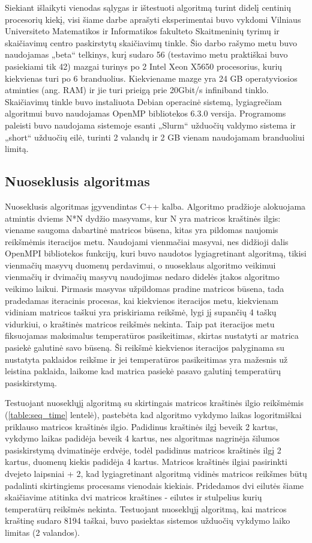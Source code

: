 \documentclass{VUMIFPSbakalaurinis}
\begin{document}
Siekiant išlaikyti vienodas sąlygas ir ištestuoti algoritmą turint didelį centinių procesorių kiekį, visi šiame darbe aprašyti eksperimentai buvo vykdomi Vilniaus Universiteto Matematikos ir Informatikos fakulteto Skaitmeninių tyrimų ir skaičiavimų centro paskirstytų skaičiavimų tinkle.
Šio darbo rašymo metu buvo naudojamas „beta“ telkinys, kurį sudaro 56 (testavimo metu praktiškai buvo pasiekiami tik 42) mazgai turinys po 2 Intel Xeon X5650 procesorius, kurių kiekvienas turi po 6 branduolius. 
Kiekviename mazge yra 24 GB operatyviosios atminties (ang. RAM) ir jie turi prieigą prie 20Gbit/s infiniband tinklo.
Skaičiavimų tinkle buvo instaliuota Debian operacinė sistemą, lygiagrečiam algoritmui buvo naudojamas OpenMP bibliotekos 6.3.0 versija.
Programoms paleisti buvo naudojama sistemoje esanti „Slurm“ užduočių valdymo sistema ir „short“ užduočių eilė, turinti 2 valandų ir 2 GB vienam naudojamam branduoliui limitą.

\subsection{Nuoseklusis algoritmas}

Nuoseklusis algoritmas įgyvendintas C++ kalba. 
Algoritmo pradžioje alokuojama atmintis dviems N*N dydžio masyvams, kur N yra matricos kraštinės ilgis: viename saugoma dabartinė matricos būsena, kitas yra pildomas naujomis reikšmėmis iteracijos metu.
Naudojami vienmačiai masyvai, nes didžioji dalis OpenMPI bibliotekos funkcijų, kuri buvo naudotos lygiagretinant algoritmą, tikisi vienmačių masyvų duomenų perdavimui, o nuoseklaus algoritmo veikimui vienmačių ir dvimačių masyvų naudojimas nedaro didelės įtakos algoritmo veikimo laikui.
Pirmasis masyvas užpildomas pradine matricos būsena, tada pradedamas iteracinis procesas, kai kiekvienos iteracijos metu, kiekvienam vidiniam matricos taškui yra priskiriama reikšmė, lygi jį supančių 4 taškų vidurkiui, o kraštinės matricos reikšmės nekinta.
Taip pat iteracijos metu fiksuojamas maksimalus temperatūros pasikeitimas, skirtas nustatyti ar matrica pasiekė galutinė savo būseną.
Ši reikšmė kiekvienos iteracijos palyginama su nustatyta paklaidos reikšme ir jei temperatūros pasikeitimas yra mažesnis už leistina paklaida, laikome kad matrica pasiekė pasavo galutinį temperatūrų pasiskirstymą.

Testuojant nuoseklųjį algoritmą su skirtingais matricos kraštinės ilgio reikšmėmis (\ref{table:seq_time} lentelė), pastebėta kad algoritmo vykdymo laikas logoritmiškai priklauso matricos kraštinės ilgio.
Padidinus kraštinės ilgį beveik 2 kartus, vykdymo laikas padidėja beveik 4 kartus, nes algoritmas nagrinėja šilumos pasiskirstymą dvimatinėje erdvėje, todėl padidinus matricos kraštinės ilgį 2 kartus, duomenų kiekis padidėja 4 kartus.
Matricos kraštinės ilgiai pasirinkti dvejeto laipsniai + 2, kad lygiagretinant algoritmą vidinės matricos reikšmes būtų padalinti skirtingiems procesams vienodais kiekiais. 
Pridedamos dvi eilutės šiame skaičiavime atitinka dvi matricos kraštines - eilutes ir stulpelius kurių temperatūrų reikšmės nekinta.
Testuojant nuoseklųjį algoritmą, kai matricos kraštinę sudaro 8194 taškai, buvo pasiektas sistemos užduočių vykdymo laiko limitas (2 valandos).
\end{document}
